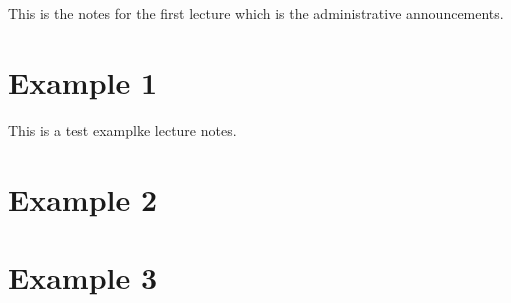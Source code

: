 
This is the notes for the first lecture which is the administrative announcements.
\section{Example 1}

This is a test examplke lecture notes.
\section{Example 2}
\section{Example 3}